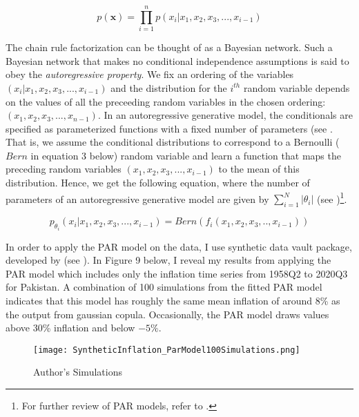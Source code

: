 \documentclass[12pt]{article}
\newcommand{\1}{\mathbbm 1}
\begin{document}
	    \begin{equation}
	    	p(\mathbf{x}) = \prod_{i = 1}^{n} p(x_{i} | x_{1}, x_{2}, x_{3}, ..., x_{i-1})
	    \end{equation}
	    
	    The chain rule factorization can be thought of as a Bayesian network. Such a Bayesian network that makes no conditional independence assumptions is said to obey the \textit{autoregressive property}. We fix an ordering of the variables $(x_{i} | x_{1}, x_{2}, x_{3}, ..., x_{i-1})$  and the distribution for the $i^{th}$ random variable depends on the values of all the preceeding random variables in the chosen ordering: $(x_{1}, x_{2}, x_{3}, ..., x_{n-1})$. In an autoregressive generative model, the conditionals are specified as parameterized functions with a fixed number of parameters (see \cite{salakhutdinov2015learning}. That is, we assume the conditional distributions to correspond to a Bernoulli ($Bern$ in equation 3 below) random variable and learn a function that maps the preceding random variables $(x_{1}, x_{2}, x_{3}, ..., x_{i-1})$ to the mean of this distribution. Hence, we get the following equation, where the number of parameters of an autoregressive generative model are given by $\sum_{i= 1}^{N} |\theta_{i}|$ (see \cite{grover2018stanford})\footnote{For further review of PAR models, refer to \color{blue}{https://deepgenerativemodels.github.io/notes/autoregressive/}.}.
	    
	     \begin{equation}
	     	p_{\theta_{i}}(x_{i} | x_{1}, x_{2}, x_{3}, ..., x_{i-1}) = Bern(f_{i}(x_{1}, x_{2}, x_{3}, .., x_{i-1}))
	     \end{equation}
     
     
		
		In order to apply the PAR model on the data, I use synthetic data vault package, developed by \cite{patki2016synthetic} (see {\color{blue}{https://sdv.dev/}}). In Figure 9 below, I reveal my results from applying the PAR model which includes only the inflation time series from 1958Q2 to 2020Q3 for Pakistan. A combination of 100 simulations from the fitted PAR model indicates that this model has roughly the same mean inflation of around 8\% as the output from gaussian copula. Occasionally, the PAR model draws values above 30\% inflation and below $-5\%$. 
		
		
		
		\begin{figure}[H]
			\begin{Center}
				\texttt{[image: SyntheticInflation\_ParModel100Simulations.png]}
				\caption{Author's Simulations}
			\end{Center}
		\end{figure}
		
\end{document}
